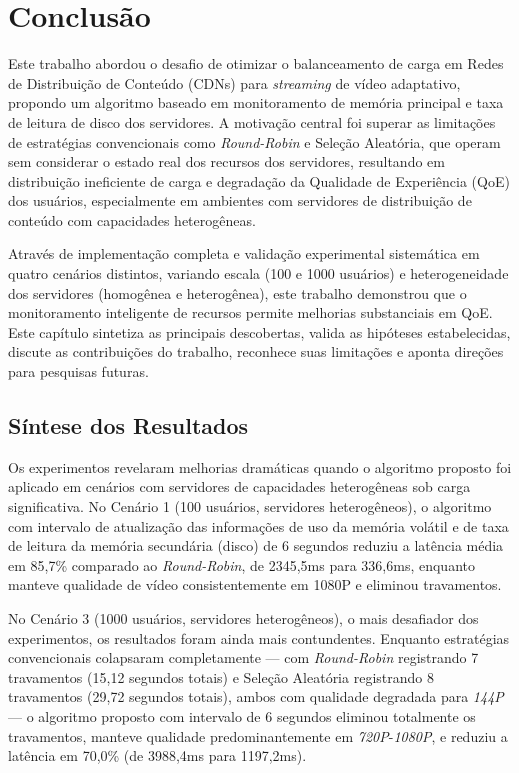 \chapter{Conclusão} \label{cap:Conclusao}

Este trabalho abordou o desafio de otimizar o balanceamento de carga em Redes de Distribuição de Conteúdo (CDNs) para \textit{streaming} de vídeo adaptativo, propondo um algoritmo baseado em monitoramento de memória principal e taxa de leitura de disco dos servidores. A motivação central foi superar as limitações de estratégias convencionais como \textit{Round-Robin} e Seleção Aleatória, que operam sem considerar o estado real dos recursos dos servidores, resultando em distribuição ineficiente de carga e degradação da Qualidade de Experiência (QoE) dos usuários, especialmente em ambientes com servidores de distribuição de conteúdo com capacidades heterogêneas.

Através de implementação completa e validação experimental sistemática em quatro cenários distintos, variando escala (100 e 1000 usuários) e heterogeneidade dos servidores (homogênea e heterogênea), este trabalho demonstrou que o monitoramento inteligente de recursos permite melhorias substanciais em QoE. Este capítulo sintetiza as principais descobertas, valida as hipóteses estabelecidas, discute as contribuições do trabalho, reconhece suas limitações e aponta direções para pesquisas futuras.

\section{Síntese dos Resultados}

Os experimentos revelaram melhorias dramáticas quando o algoritmo proposto foi aplicado em cenários com servidores de capacidades heterogêneas sob carga significativa. No Cenário 1 (100 usuários, servidores heterogêneos), o algoritmo com intervalo de atualização das informações de uso da memória volátil e de taxa de leitura da memória secundária (disco) de 6 segundos reduziu a latência média em 85,7\% comparado ao \textit{Round-Robin}, de 2345,5ms para 336,6ms, enquanto manteve qualidade de vídeo consistentemente em 1080P e eliminou travamentos.

No Cenário 3 (1000 usuários, servidores heterogêneos), o mais desafiador dos experimentos, os resultados foram ainda mais contundentes. Enquanto estratégias convencionais colapsaram completamente — com \textit{Round-Robin} registrando 7 travamentos (15,12 segundos totais) e Seleção Aleatória registrando 8 travamentos (29,72 segundos totais), ambos com qualidade degradada para \textit{144P} — o algoritmo proposto com intervalo de 6 segundos eliminou totalmente os travamentos, manteve qualidade predominantemente em \textit{720P}-\textit{1080P}, e reduziu a latência em 70,0\% (de 3988,4ms para 1197,2ms).


